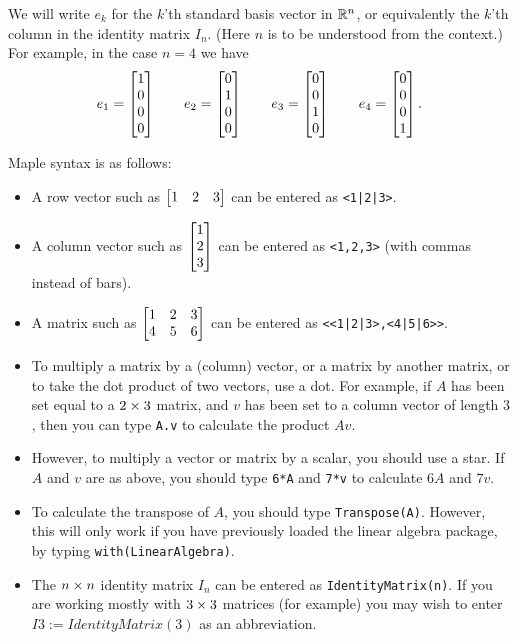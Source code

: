 \documentclass[reqno]{amsart}
\theoremstyle{definition}
\newcommand{\idx}[1]{{#1}\index{#1}}
\begin{document}
We will write $e_k$ for the $k$'th \idx{standard basis vector} in ${\mathbb{R}}^n$, or
equivalently the $k$'th column in the identity matrix $I_n$.  (Here
$n$ is to be understood from the context.)  For example, in the case
$n=4$ we have
\[ e_1 = \left[\begin{matrix} 1 \\ 0 \\ 0 \\ 0 \end{matrix}\right] \qquad
   e_2 = \left[\begin{matrix} 0 \\ 1 \\ 0 \\ 0 \end{matrix}\right] \qquad
   e_3 = \left[\begin{matrix} 0 \\ 0 \\ 1 \\ 0 \end{matrix}\right] \qquad
   e_4 = \left[\begin{matrix} 0 \\ 0 \\ 0 \\ 1 \end{matrix}\right].
\]

\idx{Maple} syntax is as follows:
\begin{itemize}
 \item A row vector such as $\left[\begin{matrix} 1 & 2 & 3 \end{matrix}\right]$ can be entered as
  \verb+<1|2|3>+.
 \item A column vector such as $\left[\begin{matrix} 1\\2\\3\end{matrix}\right]$ can be entered as
  \verb+<1,2,3>+ (with commas instead of bars).
 \item A matrix such as $\left[\begin{matrix} 1&2&3\\4&5&6\end{matrix}\right]$ can be entered as 
  \verb+<<1|2|3>,<4|5|6>>+.
 \item To multiply a matrix by a (column) vector, or a matrix by
  another matrix, or to take the dot product of two vectors, use a
  dot.  For example, if $A$ has been set equal to a $2\times 3$ matrix,
  and $v$ has been set to a column vector of length $3$, then you can
  type \verb+A.v+ to calculate the product $Av$.
 \item However, to multiply a vector or matrix by a scalar, you should
  use a star.  If $A$ and $v$ are as above, you should type \verb+6*A+
  and \verb+7*v+ to calculate $6A$ and $7v$.
 \item To calculate the transpose of $A$, you should type
  \verb+Transpose(A)+.  However, this will only work if you have
  previously loaded the linear algebra package, by typing
  \verb+with(LinearAlgebra)+. 
 \item The $n\times n$ identity matrix $I_n$ can be entered as
  \verb+IdentityMatrix(n)+.  If you are working mostly with $3\times 3$
  matrices (for example) you may wish to enter $I3:=IdentityMatrix(3)$
  as an abbreviation.  
\end{itemize}
\end{document}
